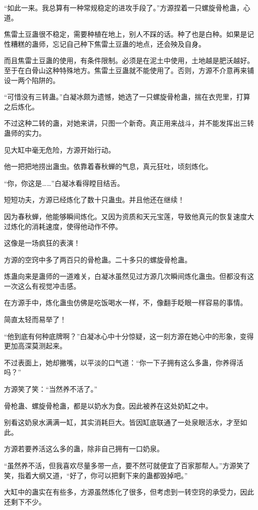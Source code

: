 \begin{this_body}
“如此一来。我总算有一种常规稳定的进攻手段了。”方源捏着一只螺旋骨枪蛊，心道。

焦雷土豆蛊很不稳定，需要种植在地上，别人不踩的话。种了也是白种。如果是记性糟糕的蛊师，忘记自己种下焦雷土豆蛊的地点，还会殃及自身。

而且焦雷土豆蛊的使用，有条件限制。必须是在泥土中使用，土地越是肥沃越好。至于在白骨山这种特殊地方。焦雷土豆蛊就不能使用了。否则，方源不介意再来铺设一两个陷阱的。

“可惜没有三转蛊。”白凝冰颇为遗憾，她选了一只螺旋骨枪蛊，揣在衣兜里，打算之后炼化。

不过这种二转的蛊，对她来讲，只图一个新奇。真正用来战斗，并不能发挥出三转蛊师的实力。

见大缸中毫无危险，方源开始行动。

他一把把地捞出蛊虫。依靠着春秋蝉的气息，真元狂吐，顷刻炼化。

“你，你这是……”白凝冰看得瞠目结舌。

短短功夫，方源已经炼化了数十只蛊虫。并且他还在继续！

因为春秋蝉，他能够瞬间炼化。又因为资质和天元宝莲，导致他真元的恢复速度大过炼化的消耗速度，使得他动作不停。

这像是一场疯狂的表演！

方源的空窍中多了两百只的骨枪蛊。二十多只的螺旋骨枪蛊。

炼蛊向来是蛊师的一道难关，白凝冰虽然见过方源几次瞬间炼化蛊虫。但都没有这一次这么有视觉冲击感。

在方源手中，炼化蛊虫仿佛是吃饭喝水一样，不，像翻手眨眼一样容易的事情。

简直太轻而易举了！

“他到底有何种底牌啊？”白凝冰心中十分惊疑，这一刻方源在她心中的形象，变得更加高深莫测起来。

不过表面上，她却撇嘴，以平淡的口气道：“你一下子拥有这么多蛊，你养得活吗？”

方源笑了笑：“当然养不活了。”

骨枪蛊、螺旋骨枪蛊，都是以奶水为食。因此被养在这处奶缸之中。

别看这奶泉水满满一缸，其实消耗巨大。皆因缸底联通了一处泉眼活水，才至如此。

方源若要养活这么多的蛊，除非自己拥有一口奶泉。

“虽然养不活，但我喜欢尽量多带一点，要不然可就便宜了百家那帮人。”方源笑了笑，指着大纲又道，“好了，你可以把剩下来的蛊都毁掉吧。”

大缸中的蛊实在有些多，方源虽然炼化了很多，但考虑到一转空窍的承受力，因此还剩下不少。


\end{this_body}
